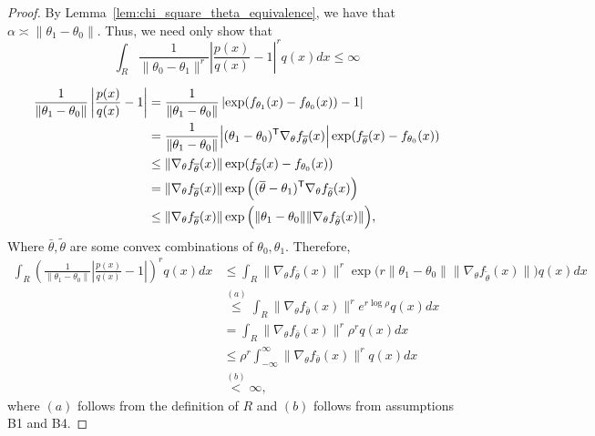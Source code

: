 \documentclass{article}
\begin{document}
\begin{proof}
By Lemma~\ref{lem:chi_square_theta_equivalence}, we have that $\alpha \asymp \| \theta_1 - \theta_0 \|$. Thus, we need only show that
\[
\int_R \frac{1}{\| \theta_0 - \theta_1 \|^r} \left| \frac{p(x)}{q(x)} - 1 \right|^r q(x) dx \leq \infty
\]




\begin{align*}
\frac{1}{\| \theta_1 - \theta_0\|}  \left| \frac{p(x)}{q(x)} - 1 \right| &=
    \frac{1}{\| \theta_1 - \theta_0\|}  
        \left| \exp( f_{\theta_1}(x) - f_{\theta_0}(x) ) - 1 \right| \\
   &=  \frac{1}{\| \theta_1 - \theta_0\|} \Big|(\theta_1 - \theta_0)^{\mathsf{T}} \nabla_{\theta} f_{\overline{\theta}}(x)  \Big|
      \exp( f_{\overline{\theta}}(x) - f_{\theta_0}(x)) \\
  &\leq \| \nabla_{\theta} f_{\overline{\theta}}(x) \|   \exp( f_{\overline{\theta}}(x) - f_{\theta_0}(x)) \\
  &= \|  \nabla_{\theta} f_{\overline{\theta}}(x) \| 
       \exp\Big( (\overline{\theta} - \theta_1)^{\mathsf{T}} \nabla_{\theta} f_{\widetilde{\theta}}(x) \Big) \\
  &\leq  \|  \nabla_{\theta} f_{\overline{\theta}}(x) \| 
        \exp\Big( \| \theta_1 - \theta_0\| \| \nabla_{\theta} f_{\widetilde{\theta}}(x) \| \Big),
\end{align*}
Where $\bar{\theta}, \tilde{\theta}$ are some convex combinations of $\theta_0, \theta_1$. Therefore, 
\begin{align*}
\int_R \left( \frac{1}{\| \theta_1 - \theta_0\|} \left| \frac{p(x)}{q(x)} - 1 \right| \right)^r q(x) dx &\leq
    \int_R  \|  \nabla_{\theta} f_{\bar{\theta}}(x) \|^r
        \exp\Big( r \| \theta_1 - \theta_0\| \| \nabla_{\theta} f_{\tilde{\theta}}(x) \| \Big)  q(x) dx \\
  &\stackrel{(a)}\leq   \int_R  \|  \nabla_{\theta} f_{\bar{\theta}}(x) \|^r
        e^{r \log \rho}  q(x) dx \\
  &= \int_{R}  \|  \nabla_{\theta} f_{\bar{\theta}}(x) \|^r
       \rho^r  q(x) d x \\
  &\leq \rho^r  \int_{-\infty}^{\infty} \|  \nabla_{\theta} f_{\bar{\theta}}(x) \|^r
        q(x) d x \\
   &\stackrel{(b)} < \infty,
\end{align*}
where $(a)$ follows from the definition of $R$ and $(b)$ follows from assumptions B1 and B4.
\end{proof}
\end{document}
